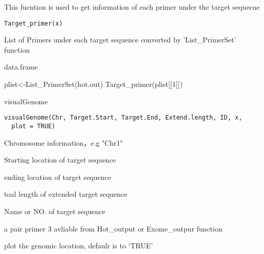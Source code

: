 \documentclass[a4paper]{book}
\begin{document}
%
\begin{Description}\relax
This fucntion is used to get information of each primer under the target sequecne
\end{Description}
%
\begin{Usage}
\begin{verbatim}
Target_primer(x)
\end{verbatim}
\end{Usage}
%
\begin{Arguments}
\begin{ldescription}
\item[\code{x}] List of Primers under each target sequence converted by 'List\_PrimerSet' function
\end{ldescription}
\end{Arguments}
%
\begin{Value}
data.frame
\end{Value}
%
\begin{Examples}
\begin{ExampleCode}
plist<-List_PrimerSet(hot.out)
Target_primer(plist[[1]])
\end{ExampleCode}
\end{Examples}
%
\begin{Description}\relax
visualGenome
\end{Description}
%
\begin{Usage}
\begin{verbatim}
visualGenome(Chr, Target.Start, Target.End, Extend.length, ID, x,
  plot = TRUE)
\end{verbatim}
\end{Usage}
%
\begin{Arguments}
\begin{ldescription}
\item[\code{Chr}] Chromosome information，e.g "Chr1"

\item[\code{Target.Start}] Starting location of target sequence

\item[\code{Target.End}] ending location of target sequence

\item[\code{Extend.length}] toal length of extended target sequence

\item[\code{ID}] Name or NO. of target sequence

\item[\code{x}] a pair primer 3 avliable from Hot\_output or Exome\_outpur function

\item[\code{plot}] plot the genomic location, defaulr is to ‘TRUE’
\end{ldescription}
\end{Arguments}
\end{document}
